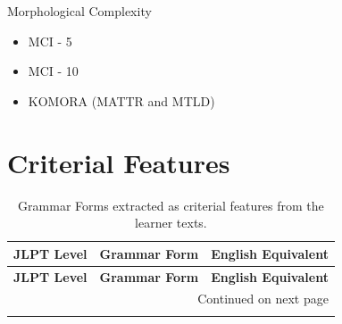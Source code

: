 Morphological Complexity
\begin{itemize}
    \item MCI - 5
    \item MCI - 10
    \item KOMORA (MATTR and MTLD)
\end{itemize}

\section{Criterial Features}
\begin{longtable}{p{2cm} p{4cm} p{8cm}}
\caption{Grammar Forms extracted as criterial features from the learner texts.
\label{tab:Criterial-Features}}\\
\toprule
\textbf{JLPT Level} & \textbf{Grammar Form} & \textbf{English Equivalent}  \\
\midrule
\endfirsthead

\toprule
\textbf{JLPT Level} & \textbf{Grammar Form} & \textbf{English Equivalent}\\
\midrule
\endhead

\midrule \multicolumn{3}{r}{{Continued on next page}}\\
\midrule
\endfoot

\bottomrule
\endlastfoot


\end{longtable}
